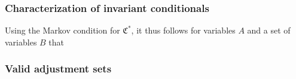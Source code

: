 \documentclass{beamer}
\begin{document}
\begin{frame}
    \frametitle{Characterization of invariant conditionals}
    \begin{flushleft}
        Using the Markov condition for $\mathfrak{C}^*$, it thus follows for variables $A$ and a set of
        variables $B$ that
    \end{flushleft}
\end{frame}

\begin{frame}
    \frametitle{Valid adjustment sets}
\end{frame}
\end{document}
